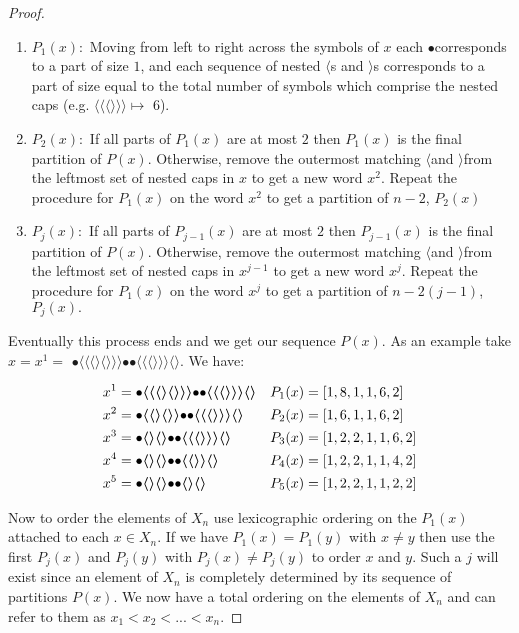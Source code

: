 \documentclass[11pt]{article} %
\newcommand{\lcap}{\boldmath$\langle$\unboldmath}
\newcommand{\rcap}{\boldmath$\rangle$\unboldmath}
\newcommand{\dotmap}{$\bullet$}
\begin{document}
\begin{proof}
\begin{enumerate}
\item $P_1(x):$ Moving from left to right across the symbols of $x$ each \dotmap\hspace{1mm}corresponds to a part of size $1$, and each sequence of nested \lcap s and \rcap s corresponds to a part of size equal to the total number of symbols which comprise the nested caps (e.g. \lcap\lcap\lcap\rcap\rcap\rcap $\mapsto$ 6).
\item $P_2(x):$ If all parts of $P_1(x)$ are at most $2$ then $P_1(x)$ is the final partition of $P(x)$. Otherwise, remove the outermost matching \lcap and \rcap\hspace{1mm}from the leftmost set of nested caps in $x$ to get a new word $x^2$. Repeat the procedure for $P_1(x)$ on the word $x^2$ to get a partition of $n-2$, $P_2(x)$
\item $P_j(x):$ If all parts of $P_{j-1}(x)$ are at most $2$ then $P_{j-1}(x)$ is the final partition of $P(x)$. Otherwise, remove the outermost matching \lcap and \rcap\hspace{1mm}from the leftmost set of nested caps in $x^{j-1}$ to get a new word $x^{j}$. Repeat the procedure for $P_1(x)$ on the word $x^j$ to get a partition of $n-2(j-1)$, $P_j(x).$
\end{enumerate}

Eventually this process ends and we get our sequence $P(x)$. As an example take $x=x^1=$ \dotmap\lcap\lcap\lcap\rcap\lcap\rcap\rcap\rcap\dotmap\dotmap\lcap\lcap\lcap\rcap\rcap\rcap\lcap\rcap. We have:

\begin{align*}
x^1&= \text{\dotmap\lcap\lcap\lcap\rcap\lcap\rcap\rcap\rcap\dotmap\dotmap\lcap\lcap\lcap\rcap\rcap\rcap\lcap\rcap} &P_1(x)&=[1,8,1,1,6,2] \\
x^2&= \text{\dotmap\lcap\lcap\rcap\lcap\rcap\rcap\dotmap\dotmap\lcap\lcap\lcap\rcap\rcap\rcap\lcap\rcap} &P_2(x)&=[1,6,1,1,6,2] \\
x^3&= \text{\dotmap\lcap\rcap\lcap\rcap\dotmap\dotmap\lcap\lcap\lcap\rcap\rcap\rcap\lcap\rcap} &P_3(x)&=[1,2,2,1,1,6,2] \\
x^4&= \text{\dotmap\lcap\rcap\lcap\rcap\dotmap\dotmap\lcap\lcap\rcap\rcap\lcap\rcap} &P_4(x)&=[1,2,2,1,1,4,2] \\
x^5&= \text{\dotmap\lcap\rcap\lcap\rcap\dotmap\dotmap\lcap\rcap\lcap\rcap} &P_5(x)&=[1,2,2,1,1,2,2] 
\end{align*}

Now to order the elements of $X_n$ use lexicographic ordering on the $P_1(x)$ attached to each $x\in X_n$. If we have $P_1(x)=P_1(y)$ with $x \neq y$ then use the first $P_j(x)$ and $P_j(y)$ with $P_j(x) \neq P_j(y)$ to order $x$ and $y$. Such a $j$ will exist since an element of $X_n$ is completely determined by its sequence of partitions $P(x)$. We now have a total ordering on the elements of $X_n$ and can refer to them as $x_1 < x_2 < ... <x_n$.


\end{proof}
\end{document}
